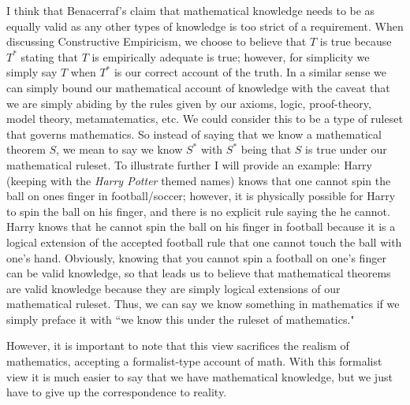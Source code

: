 \documentclass[11pt]{article}
\begin{document}
I think that Benacerraf's claim that mathematical knowledge needs to be as equally valid as any other types of knowledge is too strict of a requirement. When discussing Constructive Empiricism, we choose to believe that $T$ is true because $T^*$ stating that $T$ is empirically adequate is true; however, for simplicity we simply say $T$ when $T^*$ is our correct account of the truth. In a similar sense we can simply bound our mathematical account of knowledge with the caveat that we are simply abiding by the rules given by our axioms, logic, proof-theory, model theory, metamatematics, etc. We could consider this to be a type of ruleset that governs mathematics. So instead of saying that we know a mathematical theorem $S$, we mean to say we know $S^*$ with $S^*$ being that $S$ is true under our mathematical ruleset. To illustrate further I will provide an example: Harry (keeping with the\textit{ Harry Potter} themed names) knows that one cannot spin the ball on ones finger in football/soccer; however, it is physically possible for Harry to spin the ball on his finger, and there is no explicit rule saying the he cannot. Harry knows that he cannot spin the ball on his finger in football because it is a logical extension of the accepted football rule that one cannot touch the ball with one's hand. Obviously, knowing that you cannot spin a football on one's finger can be valid knowledge, so that leads us to believe that mathematical theorems are valid knowledge because they are simply logical extensions of our mathematical ruleset. Thus, we can say we know something in mathematics if we simply preface it with ``we know this under the ruleset of mathematics."

However, it is important to note that this view sacrifices the realism of mathematics, accepting a formalist-type account of math. With this formalist view it is much easier to say that we have mathematical knowledge, but we just have to give up the correspondence to reality.
\end{document}
